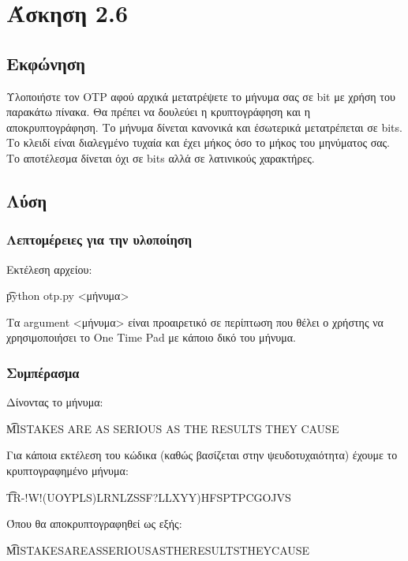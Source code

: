 \section{Άσκηση 2.6}

\subsection{Εκφώνηση}

Υλοποιήστε τον OTP αφού αρχικά μετατρέψετε το μήνυμα σας σε bit με χρήση του παρακάτω πίνακα. Θα πρέπει να δουλεύει η κρυπτογράφηση και η αποκρυπτογράφηση. Το μήνυμα δίνεται κανονικά και έσωτερικά μετατρέπεται σε bits. Το κλειδί είναι διαλεγμένο τυχαία και έχει μήκος όσο το μήκος του μηνύματος σας. Το αποτέλεσμα δίνεται όχι σε bits αλλά σε λατινικούς χαρακτήρες.

\subsection{Λύση} 

\subsubsection{Λεπτομέρειες για την υλοποίηση}

Εκτέλεση αρχείου:

\begin{center}
    \t{python otp.py <μήνυμα>}
\end{center}

Τα argument <μήνυμα> είναι προαιρετικό σε περίπτωση που θέλει ο χρήστης να χρησιμοποιήσει το One Time Pad με κάποιο δικό του μήνυμα.

\subsubsection{Συμπέρασμα}

Δίνοντας το μήνυμα:

\begin{center}
    \t{MISTAKES ARE AS SERIOUS AS THE RESULTS THEY CAUSE}
\end{center}

Για κάποια εκτέλεση του κώδικα (καθώς βασίζεται στην ψευδοτυχαιότητα) έχουμε το κρυπτογραφημένο μήνυμα: 

\begin{center}
    \t{TR-!W!(UOYPLS)LRNLZSSF?LLXYY)HFSPTPCGOJVS}
\end{center}

Όπου θα αποκρυπτογραφηθεί ως εξής:

\begin{center}
    \t{MISTAKESAREASSERIOUSASTHERESULTSTHEYCAUSE}
\end{center}